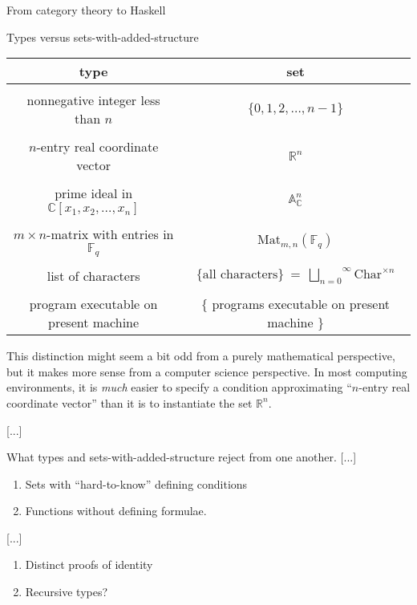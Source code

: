 \documentclass[11pt, a4paper]{article}
\begin{document}
\begin{section}{From category theory to Haskell}
\begin{subsection}{Types versus sets-with-added-structure}
\begin{center}
\begin{tabular}{c|c}
{\bf type} & {\bf set}
\\[4pt]
\hline\hline
\\[-10pt]
nonnegative integer less than $n$ & $\{0,1,2,\dots,n-1\}$
\\[4pt]
\hline
\\[-10pt]
$n$-entry real coordinate vector
&
$\mathbb{R}^n$
\\[4pt]
\hline
\\[-10pt]
prime ideal in $\mathbb{C}[x_1,x_2,\dots,x_n]$
&
$\mathbb{A}^{\!n}_{\mathbb{C}}$
\\[4pt]
\hline
\\[-10pt]
$m\!\times\!n$-matrix with entries in $\mathbb{F}_{\!q}$
&
$\text{Mat}_{m,n}(\mathbb{F}_{\!q})$
\\[4pt]
\hline
\\[-10pt]
list of characters
&
$\{\text{all characters}\}\ =\ \overset{\infty}{\underset{n=0}{\bigsqcup}}\text{Char}^{\times n}$
\\[4pt]
\hline
\\[-10pt]
program executable on present machine
&
$\{\!$
programs executable on present machine
$\!\}$
\\[4pt]
\end{tabular}

\end{center}

\noindent
This distinction might seem a bit odd from a purely mathematical perspective, but it makes more sense from a computer science perspective. In most computing environments, it is {\em much} easier to specify a condition approximating ``$n$-entry real coordinate vector'' than it is to instantiate the set $\mathbb{R}^{n}$.

[...]

\begin{subsubsection}{What types and sets-with-added-structure reject from one another.}
[...]

\begin{enumerate}
\item
Sets with ``hard-to-know'' defining conditions
\item
Functions without defining formulae.
\end{enumerate}

[...]

\begin{enumerate}
\item
Distinct proofs of identity
\item
Recursive types?
\end{enumerate}


\end{subsubsection}
\end{subsection}
\end{section}
\end{document}
